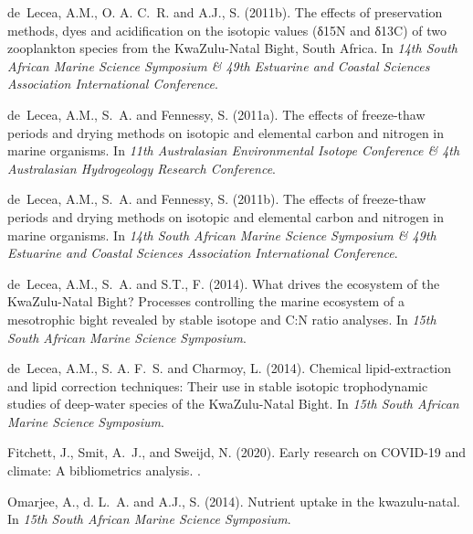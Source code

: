 \begin{thebibliography}{}
  de~Lecea, A.M., O. A. C.~R. and A.J., S. (2011b).
  \newblock The effects of preservation methods, dyes and acidification on the
    isotopic values (δ15{N} and δ13{C}) of two zooplankton species from the
    {K}wa{Z}ulu-{N}atal {B}ight, {S}outh {A}frica.
  \newblock In {\em 14th South African Marine Science Symposium \& 49th Estuarine
    and Coastal Sciences Association International Conference}.
  
  de~Lecea, A.M., S.~A. and Fennessy, S. (2011a).
  \newblock The effects of freeze-thaw periods and drying methods on isotopic and
    elemental carbon and nitrogen in marine organisms.
  \newblock In {\em 11th Australasian Environmental Isotope Conference \& 4th
    Australasian Hydrogeology Research Conference}.
  
  de~Lecea, A.M., S.~A. and Fennessy, S. (2011b).
  \newblock The effects of freeze-thaw periods and drying methods on isotopic and
    elemental carbon and nitrogen in marine organisms.
  \newblock In {\em 14th South African Marine Science Symposium \& 49th Estuarine
    and Coastal Sciences Association International Conference}.
  
  de~Lecea, A.M., S.~A. and S.T., F. (2014).
  \newblock What drives the ecosystem of the {K}wa{Z}ulu-{N}atal {B}ight?
    {P}rocesses controlling the marine ecosystem of a mesotrophic bight revealed
    by stable isotope and {C:N} ratio analyses.
  \newblock In {\em 15th South African Marine Science Symposium}.
  
  de~Lecea, A.M., S. A. F.~S. and Charmoy, L. (2014).
  \newblock Chemical lipid-extraction and lipid correction techniques: Their use
    in stable isotopic trophodynamic studies of deep-water species of the
    {K}wa{Z}ulu-{N}atal {B}ight.
  \newblock In {\em 15th South African Marine Science Symposium}.
  
  Fitchett, J., Smit, A.~J., and Sweijd, N. (2020).
  \newblock Early research on {COVID}-19 and climate: {A} bibliometrics analysis.
  .
  
  Omarjee, A., d. L.~A. and A.J., S. (2014).
  \newblock Nutrient uptake in the kwazulu-natal.
  \newblock In {\em 15th South African Marine Science Symposium}.
  

\end{thebibliography}
